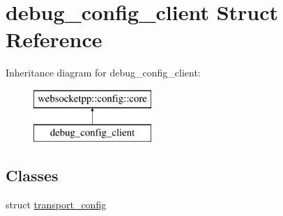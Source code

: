 \hypertarget{structdebug__config__client}{}\section{debug\+\_\+config\+\_\+client Struct Reference}
\label{structdebug__config__client}
Inheritance diagram for debug\+\_\+config\+\_\+client\+:\begin{figure}[H]
\begin{center}
\leavevmode
\includegraphics[height=2.000000cm]{structdebug__config__client}
\end{center}
\end{figure}
\subsection*{Classes}
\begin{DoxyCompactItemize}
\item 
struct \hyperlink{structdebug__config__client_1_1transport__config}{transport\+\_\+config}
\end{DoxyCompactItemize}
